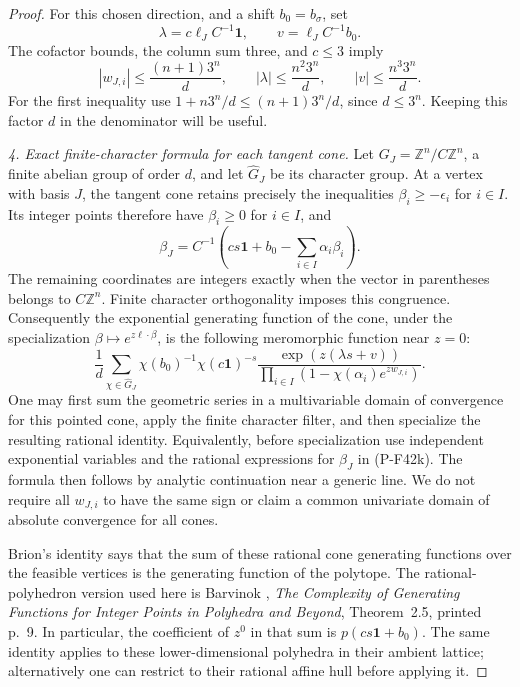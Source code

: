 \begin{proof}
For this chosen direction, and a shift $b_0=b_\sigma$, set
\[
 \lambda=c\ell_J C^{-1}\mathbf1,\qquad
 v=\ell_J C^{-1}b_0.
\]
The cofactor bounds, the column sum three, and $c\le3$ imply
\[
 |w_{J,i}|\le\frac{(n+1)3^n}{d},\qquad
 |\lambda|\le\frac{n^2 3^n}{d},\qquad
 |v|\le\frac{n^3 3^n}{d}.
 \tag{P-F42j}
\]
For the first inequality use
$1+n3^n/d\le(n+1)3^n/d$, since $d\le3^n$.
Keeping this factor $d$ in the denominator will be useful.

\emph{4. Exact finite-character formula for each tangent cone.}
Let $G_J=\mathbb Z^n/C\mathbb Z^n$, a finite abelian group of
order $d$, and let $\widehat G_J$ be its character group.
At a vertex with basis $J$, the tangent cone retains precisely
the inequalities $\beta_i\ge-\epsilon_i$ for $i\in I$.
Its integer points therefore have $\beta_i\ge0$ for $i\in I$,
and
\[
 \beta_J=C^{-1}\left(cs\mathbf1+b_0-
                            \sum_{i\in I}\alpha_i\beta_i\right).
 \tag{P-F42k}
\]
The remaining coordinates are integers exactly when the vector
in parentheses belongs to $C\mathbb Z^n$.
Finite character orthogonality imposes this congruence.
Consequently the exponential generating function of the cone,
under the specialization $\beta\mapsto e^{z\ell\cdot\beta}$, is
the following meromorphic function near $z=0$:
\[
 \frac1d\sum_{\chi\in\widehat G_J}
 \chi(b_0)^{-1}\chi(c\mathbf1)^{-s}
 \frac{\exp(z(\lambda s+v))}
      {\prod_{i\in I}(1-\chi(\alpha_i)e^{z w_{J,i}})}.
 \tag{P-F42l}
\]
One may first sum the geometric series in a multivariable
domain of convergence for this pointed cone, apply the finite
character filter, and then specialize the resulting rational
identity. Equivalently, before specialization use independent
exponential variables and the rational expressions for
$\beta_J$ in (P-F42k). The formula then follows by analytic
continuation near a generic line. We do not require all
$w_{J,i}$ to have the same sign or claim a common univariate
domain of absolute convergence for all cones.

Brion's identity says that the sum of these rational cone
generating functions over the feasible vertices is the
generating function of the polytope. The rational-polyhedron
version used here is Barvinok \cite{CBarvinokGF}, \emph{The Complexity of
Generating Functions for Integer Points in Polyhedra and
Beyond}, Theorem~2.5, printed p.~9. In particular, the
coefficient of $z^0$ in that sum is $p(cs\mathbf1+b_0)$.
The same identity applies to these lower-dimensional
polyhedra in their ambient lattice; alternatively one can
restrict to their rational affine hull before applying it.


\end{proof}
